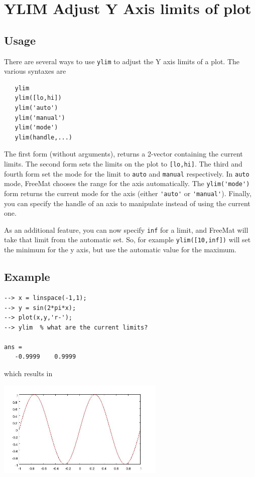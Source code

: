 \section{YLIM Adjust Y Axis limits of plot}

\subsection{Usage}

There are several ways to use \verb|ylim| to adjust the Y axis limits of
a plot.  The various syntaxes are
\begin{verbatim}
   ylim
   ylim([lo,hi])   
   ylim('auto')
   ylim('manual')
   ylim('mode')
   ylim(handle,...)
\end{verbatim}
The first form (without arguments), returns a 2-vector containing the
current limits.  The second form sets the limits on the plot to \verb|[lo,hi]|.
The third and fourth form set the mode for the limit to \verb|auto| and \verb|manual|
respectively.  In \verb|auto| mode, FreeMat chooses the range for the axis 
automatically.  The \verb|ylim('mode')| form returns the current mode for the axis
(either \verb|'auto'| or \verb|'manual'|).  Finally, you can specify the handle of an
axis to manipulate instead of using the current one.

As an additional feature, you can now specify \verb|inf| for a limit, and
FreeMat will take that limit from the automatic set.  So, for example 
\verb|ylim([10,inf])| will set the minimum for the y axis, but use the
automatic value for the maximum.
\subsection{Example}

\begin{verbatim}
--> x = linspace(-1,1);
--> y = sin(2*pi*x);
--> plot(x,y,'r-');
--> ylim  % what are the current limits?

ans = 
   -0.9999    0.9999 
\end{verbatim}
which results in


\centerline{\includegraphics[width=8cm]{ylim1}}

